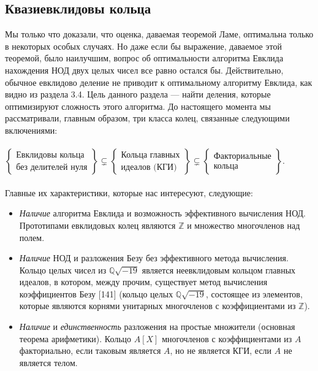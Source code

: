 \documentclass{mai_book}
\begin{document}
\subsection{Квазиевклидовы кольца}
\noindent Мы только что доказали, что оценка, даваемая теоремой Ламе, оптимальна только в некоторых особых случаях. Но даже если бы выражение, даваемое этой теоремой, было наилучшим, вопрос об оптимальности алгоритма Евклида нахождения НОД двух целых чисел все равно
остался бы. Действительно, обычное евклидово деление не приводит
к оптимальному алгоритму Евклида, как видно из раздела 3.4. Цель
данного раздела — найти деления, которые оптимизируют сложность
этого алгоритма. До настоящего момента мы рассматривали, главным
образом, три класса колец, связанные следующими включениями:
\\\\
$ \left\lbrace
\begin{array}{c}
\text{Евклидовы кольца} \\
\text{без делителей нуля}
\end{array}
\right\rbrace \subsetneq
\left\lbrace
\begin{array}{l}
\text{Кольца главных} \\
\text{идеалов (КГИ)}
\end{array}
\right\rbrace \subsetneq
\left\lbrace
\begin{array}{l}
\text{Факториальные} \\
\text{кольца}
\end{array}
\right\rbrace .$
\\\\
Главные их характеристики, которые нас интересуют, следующие:
\begin{itemize}


\item\textit{Наличие} алгоритма Евклида и возможность эффективного вычи­сления НОД. Прототипами евклидовых колец являются $\mathbb{Z}$ и мно­жество многочленов над полем.
\item\textit{Наличие} НОД и разложения Безу без эффективного метода вычисления. Кольцо целых чисел из $\mathbb{Q}\sqrt{-19}$ является неевклидо­вым кольцом главных идеалов, в котором, между прочим, суще­ствует метод вычисления коэффициентов Безу [141] (кольцо це­лых $\mathbb{Q}\sqrt{-19}$, состоящее из элементов, которые являются корнями
унитарных многочленов с коэффициентами из $\mathbb{Z}$).
\item\textit{Наличие} и \textit{единственность} разложения на простые множители
(основная теорема арифметики). Кольцо $A[X]$ многочленов с коэффициентами из $A$ факториально, если таковым является $A$, но
не является КГИ, если $A$ не является телом.
\end{itemize}
\end{document}
